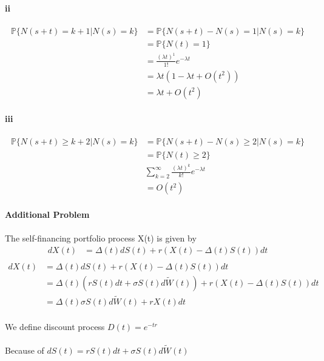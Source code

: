 \documentclass{article}
\begin{document}
\paragraph{ii}
\begin{align*}
    \mathbb{P}\{N(s+t)=k+1|N(s)=k\} & =\mathbb{P}\{N(s+t)-N(s)=1|N(s)=k\} \\
     & =\mathbb{P}\{N(t)=1\}\\
     &=\frac{(\lambda t)^1}{1!}e^{-\lambda t}\\
     &=\lambda t(1-\lambda t+ O(t^2))\\
     &=\lambda t+O(t^2)
\end{align*}
\paragraph{iii}
\begin{align*}
   \mathbb{P}\{N(s+t)\ge k+2|N(s)=k\} & =\mathbb{P}\{N(s+t)-N(s)\ge 2|N(s)=k\} \\
     & =\mathbb{P}\{N(t)\ge2\}\\
     &\sum_{k=2}^{\infty}\frac{(\lambda t)^k}{k!}e^{-\lambda t}\\
     &= O(t^2)
\end{align*}
\clearpage
\paragraph{Additional Problem}
\paragraph{}{The self-financing portfolio process X(t) is given by}
\begin{align*}
  dX(t) &=\Delta(t)dS(t)+r(X(t)-\Delta(t)S(t))dt \\
\end{align*}
\begin{align*}
 dX(t) &=\Delta(t)dS(t)+r(X(t)-\Delta(t)S(t))dt \\
  &  =\Delta(t)(rS(t)dt+\sigma S(t)d\tilde{W}(t))+r(X(t)-\Delta(t)S(t))dt  \\
  &=\Delta(t)\sigma S(t)d\tilde{W}(t)+rX(t)dt
\end{align*}
\paragraph{}{We define discount process $D(t)=e^{-tr}$}
\paragraph{}{Because of    $dS(t)=rS(t)dt+\sigma S(t)d\tilde{W}(t)$}
\end{document}
